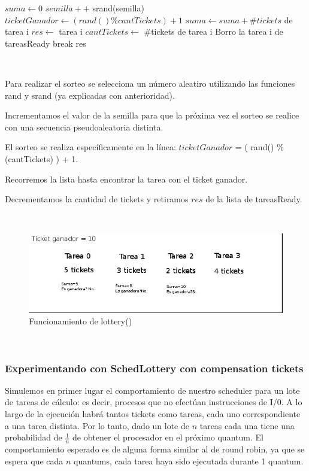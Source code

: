 \begin{algorithmic}
	\State $suma \gets 0$
      	\State $semilla++$
	\State srand(semilla)
	\State $ticketGanador \gets (rand() \% cantTickets)+1$
		\State $suma \gets suma+ \#tickets$ de tarea i		
			\State $res \gets$ tarea i
			\State $cantTickets \gets $ \#tickets de tarea i	
			\State Borro la tarea i de tareasReady
			\State break
		\EndIf
	\EndFor	
	\State \Return res
  \EndFunction
\end{algorithmic}

~

Para realizar el sorteo se selecciona un número aleatiro utilizando las funciones rand y srand (ya explicadas con anterioridad).

Incrementamos el valor de la semilla para que la próxima vez el sorteo se realice con una secuencia pseudoaleatoria distinta.

El sorteo se realiza específicamente en la línea: $ticketGanador$ = ( rand() \% (cantTickets) ) + 1.

Recorremos la lista hasta encontrar la tarea con el ticket ganador.

Decrementamos la cantidad de tickets y retiramos $res$ de la lista de tareasReady.

~

\begin{figure}[H]
  \centering\includegraphics[scale=0.5]{graficos/lottery.jpg}
  \caption{Funcionamiento de lottery()}
\end{figure}

~

\subsubsection{Experimentando con SchedLottery con compensation tickets}

Simulemos en primer lugar el comportamiento de nuestro scheduler para un lote de tareas de cálculo: es decir, procesos que no 
efectúan instrucciones de I/0. A lo largo de la ejecución habrá tantos tickets como tareas, cada uno correspondiente a una
tarea distinta. Por lo tanto, dado un lote de $n$ tareas cada una tiene una probabilidad de $\frac{1}{n}$ de obtener el procesador
en el próximo quantum. El comportamiento esperado es de alguna forma similar al de round robin, ya que se espera que cada $n$
quantums, cada tarea haya sido ejecutada durante 1 quantum.



